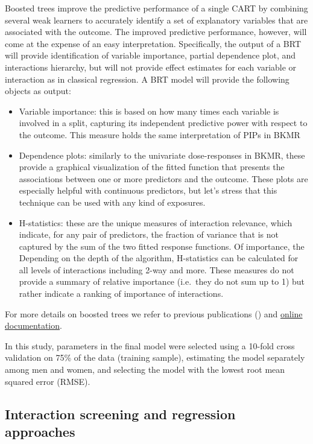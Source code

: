 \documentclass[
]{book}
\begin{document}
Boosted trees improve the predictive performance of a single
CART by combining several weak learners to accurately identify a set of
explanatory variables that are associated with the outcome. The
improved predictive performance, however, will come at the expense of an easy
interpretation. Specifically, the output of a BRT will provide identification
of variable importance, partial dependence plot, and interactions
hierarchy, but will not provide effect estimates for
each variable or interaction as in classical regression. A BRT model will provide the following objects as output:

\begin{itemize}
\item
  Variable importance: this is based on how many times each variable is
  involved in a split, capturing its independent predictive power with
  respect to the outcome. This measure holds the same interpretation of PIPs in BKMR
\item
  Dependence plots: similarly to the univariate dose-responses in BKMR, these provide a graphical visualization
  of the fitted function that presents the associations between one
  or more predictors and the outcome. These plots are especially helpful
  with continuous predictors, but let's stress that this technique can be used with any kind of exposures.
\item
  H-statistics: these are the unique measures of interaction relevance, which indicate,
  for any pair of predictors, the fraction of variance that is not captured by
  the sum of the two fitted response functions. Of importance, the
  Depending on the depth of the algorithm, H-statistics can be calculated
  for all levels of interactions including 2-way and more. These measures
  do not provide a summary of relative importance (i.e.~they do not sum
  up to 1) but rather indicate a ranking of importance of interactions.
\end{itemize}

For more details on boosted trees we refer to previous publications (\citet{lampa2014identification}) and \href{http://uc-r.github.io/gbm_regression}{online documentation}.

In this study, parameters in the final
model were selected using a 10-fold cross validation on 75\% of the data
(training sample), estimating the model separately among men and
women, and selecting the model with the lowest root mean squared
error (RMSE).

\hypertarget{interaction-screening-and-regression-approaches}{%
\subsection{Interaction screening and regression approaches}\label{interaction-screening-and-regression-approaches}}
\end{document}

